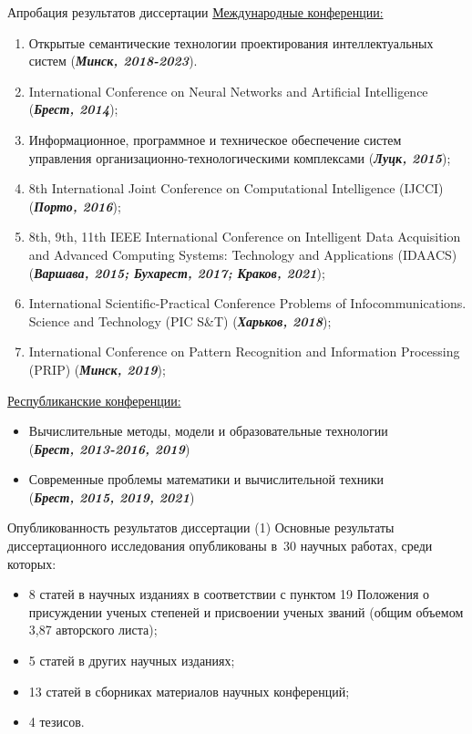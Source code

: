 \documentclass[10pt]{beamer}
\begin{document}
        \begin{frame}[shrink=5]{Апробация результатов диссертации}
            \small
            \underline{Международные конференции:}
            \begin{enumerate}
                \item Открытые семантические технологии проектирования интеллектуальных систем (\textbf{\textit{Минск, 2018-2023}}).
                \item International Conference on Neural Networks and Artificial Intelligence (\textbf{\textit{Брест, 2014}});
                \item Информационное, программное и техническое обеспечение систем управления организационно-технологическими комплексами (\textbf{\textit{Луцк, 2015}});
                \item 8th International Joint Conference on Computational Intelligence (IJCCI) (\textbf{\textit{Порто, 2016}});
                \item 8th, 9th, 11th IEEE International Conference on Intelligent Data Acquisition and Advanced Computing Systems: Technology and Applications (IDAACS) (\textbf{\textit{Варшава, 2015; Бухарест, 2017; Краков, 2021}}); 
                \item International Scientific-Practical Conference Problems of Infocommunications. Science and Technology (PIC S\&T) (\textbf{\textit{Харьков, 2018}});
                \item International Conference on Pattern Recognition and Information Processing (PRIP) (\textbf{\textit{Минск, 2019}});
            \end{enumerate}
            \underline{Республиканские конференции:}
            \begin{itemize}
                \item Вычислительные методы, модели и образовательные технологии \\ (\textbf{\textit{Брест, 2013-2016, 2019}})
                \item Современные проблемы математики и вычислительной техники \\ (\textbf{\textit{Брест, 2015, 2019, 2021}})
            \end{itemize}
        \end{frame}

        \begin{frame}{Опубликованность результатов диссертации (1)}
            \large
            Основные результаты диссертационного исследования опубликованы в~30 научных работах, среди которых: 
            \begin{itemize}
                \item 8 статей в научных изданиях в соответствии с пунктом 19 Положения о присуждении ученых степеней и присвоении ученых званий (общим объемом 3,87 авторского листа);
                \item 5 статей в других научных изданиях;
                \item 13 статей в сборниках материалов научных конференций;
                \item 4 тезисов.
            \end{itemize}
        \end{frame}
\end{document}
